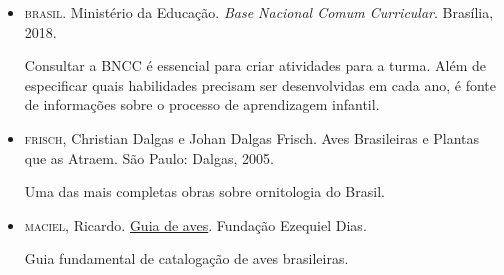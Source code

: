 \documentclass[11pt]{extarticle}
\begin{document}
\begin{itemize}

\item \textsc{brasil}. Ministério da Educação. \textit{Base Nacional Comum Curricular}. Brasília, 2018.

Consultar a \textsc{BNCC} é essencial para criar atividades para a turma. Além de especificar 
quais habilidades precisam ser desenvolvidas em cada ano, é fonte de informações sobre 
o processo de aprendizagem infantil. 

\item \textsc{frisch}, Christian Dalgas e Johan Dalgas Frisch. Aves Brasileiras e Plantas que as Atraem. São Paulo: Dalgas, 2005.

Uma das mais completas obras sobre ornitologia do Brasil. 

\item \textsc{maciel}, Ricardo. \href{http://www.funed.mg.gov.br/wp-content/uploads/2018/10/GUIA-DE-AVES-FUNED-Vers\%C3\%A3o-Net_final.pdf}{Guia de aves}. Fundação Ezequiel Dias.

Guia fundamental de catalogação de aves brasileiras.

\end{itemize}
\end{document}
